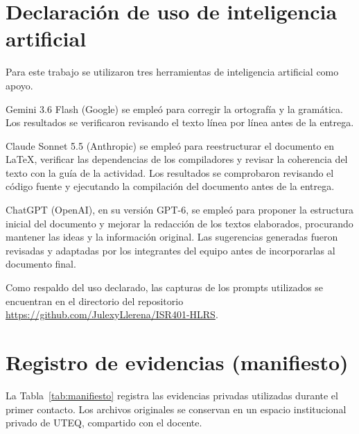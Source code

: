\documentclass[11pt,a4paper]{article}
\begin{document}
	
	\section{Declaración de uso de inteligencia artificial}
	
	Para este trabajo se utilizaron tres herramientas de inteligencia artificial como apoyo.
	
	Gemini 3.6 Flash (Google) se empleó para corregir la ortografía y la gramática. Los resultados se verificaron revisando el texto línea por línea antes de la entrega.
	
	Claude Sonnet 5.5 (Anthropic) se empleó para reestructurar el documento en LaTeX, verificar las dependencias de los compiladores y revisar la coherencia del texto con la guía de la actividad. Los resultados se comprobaron revisando el código fuente y ejecutando la compilación del documento antes de la entrega.
	
	ChatGPT (OpenAI), en su versión GPT-6, se empleó para proponer la estructura inicial del documento y mejorar la redacción de los textos elaborados, procurando mantener las ideas y la información original. Las sugerencias generadas fueron revisadas y adaptadas por los integrantes del equipo antes de incorporarlas al documento final.
	
	Como respaldo del uso declarado, las capturas de los prompts utilizados se encuentran en el directorio  del repositorio \url{https://github.com/JulexyLlerena/ISR401-HLRS}.
	
	\appendix
	
	
	\section{Registro de evidencias (manifiesto)}
	\label{anx:manifiesto}
	
	La Tabla~\ref{tab:manifiesto} registra las evidencias privadas
	utilizadas durante el primer contacto. Los archivos originales
	se conservan en un espacio institucional privado de UTEQ,
	compartido con el docente.
	
\end{document}
